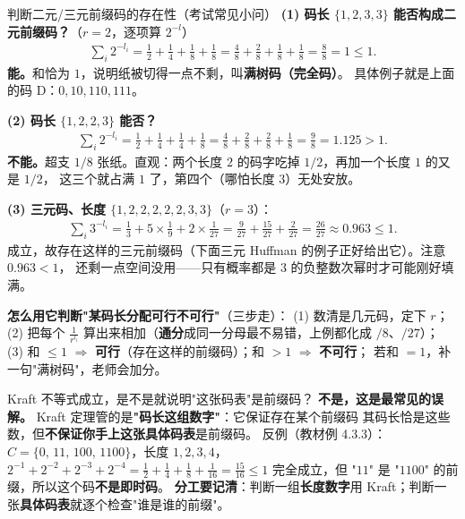 \begin{calc}{判断二元/三元前缀码的存在性（考试常见小问）}
\textbf{(1) 码长 $\{1,2,3,3\}$ 能否构成二元前缀码？}（$r=2$，逐项算 $2^{-l}$）
\begin{align*}
\sum_i2^{-l_i}=\frac12+\frac14+\frac18+\frac18
=\frac{4}{8}+\frac{2}{8}+\frac{1}{8}+\frac{1}{8}=\frac{8}{8}=1\le1 .
\end{align*}
\textbf{能。}和恰为 $1$，说明纸被切得一点不剩，叫\textbf{满树码（完全码）}。
具体例子就是上面的码 D：$0,10,110,111$。

\textbf{(2) 码长 $\{1,2,2,3\}$ 能否？}
\begin{align*}
\sum_i2^{-l_i}=\frac12+\frac14+\frac14+\frac18
=\frac{4}{8}+\frac{2}{8}+\frac{2}{8}+\frac{1}{8}=\frac{9}{8}=1.125>1 .
\end{align*}
\textbf{不能。}超支 $1/8$ 张纸。直观：两个长度 $2$ 的码字吃掉 $1/2$，再加一个长度 $1$ 的又是 $1/2$，
这三个就占满 $1$ 了，第四个（哪怕长度 $3$）无处安放。

\textbf{(3) 三元码、长度 $\{1,2,2,2,2,2,3,3\}$}（$r=3$）：
\begin{align*}
\sum_i3^{-l_i}=\frac13+5\times\frac19+2\times\frac{1}{27}
=\frac{9}{27}+\frac{15}{27}+\frac{2}{27}=\frac{26}{27}\approx0.963\le1 .
\end{align*}
成立，故存在这样的三元前缀码（下面三元 Huffman 的例子正好给出它）。注意 $0.963<1$，
还剩一点空间没用——只有概率都是 $3$ 的负整数次幂时才可能刚好填满。
\end{calc}

\textbf{怎么用它判断"某码长分配可行不可行"}（三步走）：
(1) 数清是几元码，定下 $r$；
(2) 把每个 $\frac{1}{r^{l_i}}$ 算出来相加（\textbf{通分}成同一分母最不易错，上例都化成 $/8$、$/27$）；
(3) 和 $\le1$ $\Rightarrow$ \textbf{可行}（存在这样的前缀码）；和 $>1$ $\Rightarrow$ \textbf{不可行}；
若和 $=1$，补一句"满树码"，老师会加分。

\begin{qa}{Kraft 不等式成立，是不是就说明"这张码表"是前缀码？}
\textbf{不是，这是最常见的误解。} Kraft 定理管的是\textbf{"码长这组数字"}：它保证存在某个前缀码
其码长恰是这些数，但\textbf{不保证你手上这张具体码表}是前缀码。
反例（教材例 4.3.3）：$C=\{0,\,11,\,100,\,1100\}$，长度 $1,2,3,4$，
$2^{-1}+2^{-2}+2^{-3}+2^{-4}=\frac12+\frac14+\frac18+\frac1{16}=\frac{15}{16}\le1$
完全成立，但 "$11$" 是 "$1100$" 的前缀，所以这个码\textbf{不是即时码}。
\textbf{分工要记清}：判断一组\textbf{长度数字}用 Kraft；判断一张\textbf{具体码表}就逐个检查"谁是谁的前缀"。
\end{qa}

